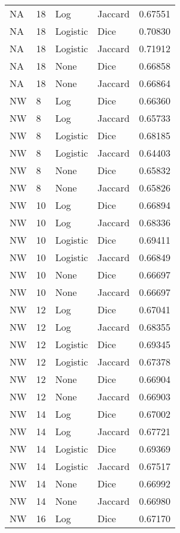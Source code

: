 \documentclass{article}
\begin{document}
\begin{center}
\begin{supertabular}{| l | l | l | l | l |}
            NA & 18 & Log & Jaccard & 0.67551 \\
            NA & 18 & Logistic & Dice & 0.70830 \\
            NA & 18 & Logistic & Jaccard & 0.71912 \\
            NA & 18 & None & Dice & 0.66858 \\
            NA & 18 & None & Jaccard & 0.66864 \\
            NW & 8 & Log & Dice & 0.66360 \\
            NW & 8 & Log & Jaccard & 0.65733 \\
            NW & 8 & Logistic & Dice & 0.68185 \\
            NW & 8 & Logistic & Jaccard & 0.64403 \\
            NW & 8 & None & Dice & 0.65832 \\
            NW & 8 & None & Jaccard & 0.65826 \\
            NW & 10 & Log & Dice & 0.66894 \\
            NW & 10 & Log & Jaccard & 0.68336 \\
            NW & 10 & Logistic & Dice & 0.69411 \\
            NW & 10 & Logistic & Jaccard & 0.66849 \\
            NW & 10 & None & Dice & 0.66697 \\
            NW & 10 & None & Jaccard & 0.66697 \\
            NW & 12 & Log & Dice & 0.67041 \\
            NW & 12 & Log & Jaccard & 0.68355 \\
            NW & 12 & Logistic & Dice & 0.69345 \\
            NW & 12 & Logistic & Jaccard & 0.67378 \\
            NW & 12 & None & Dice & 0.66904 \\
            NW & 12 & None & Jaccard & 0.66903 \\
            NW & 14 & Log & Dice & 0.67002 \\
            NW & 14 & Log & Jaccard & 0.67721 \\
            NW & 14 & Logistic & Dice & 0.69369 \\
            NW & 14 & Logistic & Jaccard & 0.67517 \\
            NW & 14 & None & Dice & 0.66992 \\
            NW & 14 & None & Jaccard & 0.66980 \\
            NW & 16 & Log & Dice & 0.67170 \\

\end{supertabular}
\end{center}
\end{document}
